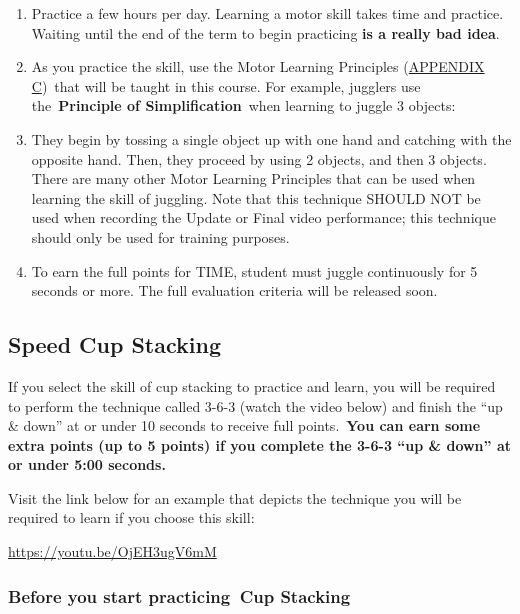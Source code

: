 \documentclass[
  letterpaper,
  DIV=11,
  numbers=noendperiod]{scrartcl}
\providecommand{\tightlist}{%
  \setlength{\itemsep}{0pt}\setlength{\parskip}{0pt}}\usepackage{longtable,booktabs,array}
\begin{document}
\begin{enumerate}
\def\labelenumi{\arabic{enumi}.}
\tightlist
\item
  Practice a few hours per day. Learning a motor skill takes time and
  practice. Waiting until the end of the term to begin practicing
  \textbf{is a really bad idea}.
\item
  As you practice the skill, use the Motor Learning Principles
  (\protect\hyperlink{sec-appendix-c}{APPENDIX C})~that will be taught
  in this course. For example, jugglers use the~\textbf{Principle of
  Simplification}~when learning to juggle 3 objects:
\item
  They begin by tossing a single object up with one hand and catching
  with the opposite hand. Then, they proceed by using 2 objects, and
  then 3 objects. There are many other Motor Learning Principles that
  can be used when learning the skill of juggling. Note that this
  technique SHOULD NOT be used when recording the Update or Final video
  performance; this technique should only be used for training
  purposes.~
\item
  To earn the full points for TIME, student must juggle continuously for
  5 seconds or more. The full evaluation criteria will be released soon.
\end{enumerate}

\hypertarget{speed-cup-stacking}{%
\subsection{Speed Cup Stacking}\label{speed-cup-stacking}}

If you select the skill of cup stacking to practice and learn, you will
be required to perform the technique called 3-6-3 (watch the video
below) and finish the ``up \& down'' at or under 10 seconds to receive
full points.~\textbf{You can earn some extra points (up to 5 points) if
you complete the 3-6-3 ``up \& down'' at or under 5:00 seconds.}

Visit the link below for an example that depicts the technique you will
be required to learn if you choose this skill:

\url{https://youtu.be/OjEH3ugV6mM}

\hypertarget{before-you-start-practicing-cup-stacking}{%
\subsubsection{\texorpdfstring{Before you start practicing~\textbf{Cup
Stacking}}{Before you start practicing~Cup Stacking}}\label{before-you-start-practicing-cup-stacking}}
\end{document}
